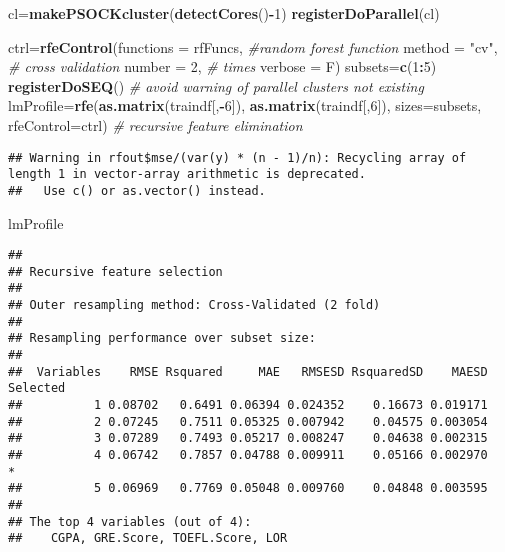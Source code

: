 \documentclass[11pt,]{article}
\newenvironment{Shaded}{\begin{snugshade}}{\end{snugshade}}
\newcommand{\CommentTok}[1]{\textcolor[rgb]{0.56,0.35,0.01}{\textit{#1}}}
\newcommand{\DataTypeTok}[1]{\textcolor[rgb]{0.13,0.29,0.53}{#1}}
\newcommand{\DecValTok}[1]{\textcolor[rgb]{0.00,0.00,0.81}{#1}}
\newcommand{\KeywordTok}[1]{\textcolor[rgb]{0.13,0.29,0.53}{\textbf{#1}}}
\newcommand{\NormalTok}[1]{#1}
\newcommand{\OperatorTok}[1]{\textcolor[rgb]{0.81,0.36,0.00}{\textbf{#1}}}
\newcommand{\StringTok}[1]{\textcolor[rgb]{0.31,0.60,0.02}{#1}}
\begin{document}
\begin{Shaded}
\begin{Highlighting}[]
\NormalTok{cl=}\KeywordTok{makePSOCKcluster}\NormalTok{(}\KeywordTok{detectCores}\NormalTok{()}\OperatorTok{-}\DecValTok{1}\NormalTok{)}
\KeywordTok{registerDoParallel}\NormalTok{(cl)}
 
\NormalTok{ctrl=}\KeywordTok{rfeControl}\NormalTok{(}\DataTypeTok{functions =}\NormalTok{ rfFuncs, }\CommentTok{#random forest function }
           \DataTypeTok{method =} \StringTok{"cv"}\NormalTok{, }\CommentTok{# cross validation}
           \DataTypeTok{number =} \DecValTok{2}\NormalTok{, }\CommentTok{# times}
           \DataTypeTok{verbose =}\NormalTok{ F)}
\NormalTok{subsets=}\KeywordTok{c}\NormalTok{(}\DecValTok{1}\OperatorTok{:}\DecValTok{5}\NormalTok{)}
\KeywordTok{registerDoSEQ}\NormalTok{() }\CommentTok{# avoid warning of parallel clusters not existing}
\NormalTok{lmProfile=}\KeywordTok{rfe}\NormalTok{(}\KeywordTok{as.matrix}\NormalTok{(traindf[,}\OperatorTok{-}\DecValTok{6}\NormalTok{]), }
              \KeywordTok{as.matrix}\NormalTok{(traindf[,}\DecValTok{6}\NormalTok{]), }
              \DataTypeTok{sizes=}\NormalTok{subsets, }
              \DataTypeTok{rfeControl=}\NormalTok{ctrl) }\CommentTok{# recursive feature elimination}
\end{Highlighting}
\end{Shaded}

\begin{verbatim}
## Warning in rfout$mse/(var(y) * (n - 1)/n): Recycling array of length 1 in vector-array arithmetic is deprecated.
##   Use c() or as.vector() instead.
\end{verbatim}

\begin{Shaded}
\begin{Highlighting}[]
\NormalTok{lmProfile}
\end{Highlighting}
\end{Shaded}

\begin{verbatim}
## 
## Recursive feature selection
## 
## Outer resampling method: Cross-Validated (2 fold) 
## 
## Resampling performance over subset size:
## 
##  Variables    RMSE Rsquared     MAE   RMSESD RsquaredSD    MAESD Selected
##          1 0.08702   0.6491 0.06394 0.024352    0.16673 0.019171         
##          2 0.07245   0.7511 0.05325 0.007942    0.04575 0.003054         
##          3 0.07289   0.7493 0.05217 0.008247    0.04638 0.002315         
##          4 0.06742   0.7857 0.04788 0.009911    0.05166 0.002970        *
##          5 0.06969   0.7769 0.05048 0.009760    0.04848 0.003595         
## 
## The top 4 variables (out of 4):
##    CGPA, GRE.Score, TOEFL.Score, LOR
\end{verbatim}
\end{document}
